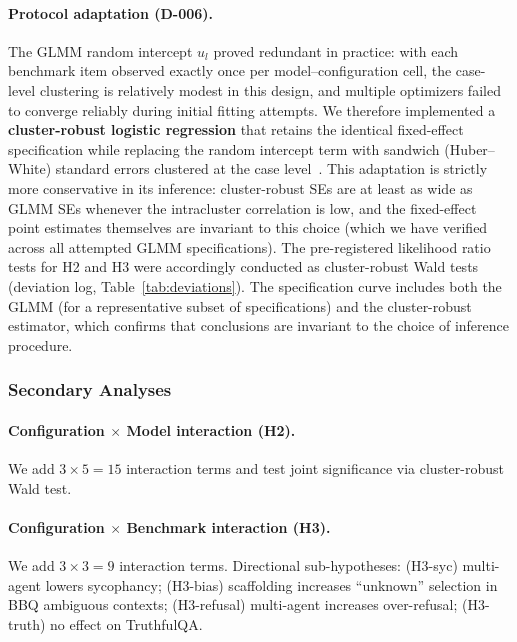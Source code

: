 \documentclass[preprint]{article}
\begin{document}
\paragraph{Protocol adaptation (D-006).}  The GLMM random intercept $u_l$ proved redundant in practice: with each benchmark item observed exactly once per model--configuration cell, the case-level clustering is relatively modest in this design, and multiple optimizers failed to converge reliably during initial fitting attempts.  We therefore implemented a \textbf{cluster-robust logistic regression} that retains the identical fixed-effect specification while replacing the random intercept term with sandwich (Huber--White) standard errors clustered at the case level~\cite{cameron2015practitioner}.  This adaptation is strictly more conservative in its inference: cluster-robust SEs are at least as wide as GLMM SEs whenever the intracluster correlation is low, and the fixed-effect point estimates themselves are invariant to this choice (which we have verified across all attempted GLMM specifications).  The pre-registered likelihood ratio tests for H2 and H3 were accordingly conducted as cluster-robust Wald tests (deviation log, Table~\ref{tab:deviations}).  The specification curve includes both the GLMM (for a representative subset of specifications) and the cluster-robust estimator, which confirms that conclusions are invariant to the choice of inference procedure.

\subsubsection{Secondary Analyses}

\paragraph{Configuration $\times$ Model interaction (H2).} We add $3 \times 5 = 15$ interaction terms and test joint significance via cluster-robust Wald test.

\paragraph{Configuration $\times$ Benchmark interaction (H3).} We add $3 \times 3 = 9$ interaction terms. Directional sub-hypotheses: (H3-syc) multi-agent lowers sycophancy; (H3-bias) scaffolding increases ``unknown'' selection in BBQ ambiguous contexts; (H3-refusal) multi-agent increases over-refusal; (H3-truth) no effect on TruthfulQA.
\end{document}
